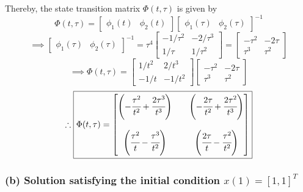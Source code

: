 Thereby, the state transition matrix \( \Phi(t,\tau) \) is given by
\begin{equation*}
    \Phi(t,\tau)
    =
    \begin{bmatrix}
        \phi_1(t) & \phi_2(t)
    \end{bmatrix}
    \begin{bmatrix}
        \phi_1(\tau) & \phi_2(\tau)
    \end{bmatrix}^{-1}
\end{equation*}
\begin{equation*}
    \implies
    \begin{bmatrix}
        \phi_1(\tau) & \phi_2(\tau)
    \end{bmatrix}^{-1}
    =
    \tau^4
    \begin{bmatrix}
        -1/\tau^2 & -2/\tau^3 \\
        1/\tau    & 1/\tau^2
    \end{bmatrix}
    =
    \begin{bmatrix}
        -\tau^2 & -2\tau \\
        \tau^3  & \tau^2
    \end{bmatrix}
\end{equation*}
\begin{equation*}
    \implies
    \Phi(t,\tau)
    =
    \begin{bmatrix}
        1/t^2 & 2/t^3  \\
        -1/t  & -1/t^2
    \end{bmatrix}
    \begin{bmatrix}
        -\tau^2 & -2\tau \\
        \tau^3  & \tau^2
    \end{bmatrix}
\end{equation*}
\begin{equation*}
    \therefore
    \boxed{
        \Phi(t,\tau)
        =
        \begin{bmatrix}
            \left( -\cfrac{\tau^2}{t^2} + \cfrac{2\tau^3}{t^3} \right)
             &  &
            \left( -\cfrac{2\tau}{t^2} + \cfrac{2\tau^2}{t^3}  \right)
            \\ \\
            \left( \cfrac{\tau^2}{t} - \cfrac{\tau^3}{t^2}  \right)
             &  &
            \left( \cfrac{2\tau}{t} - \cfrac{\tau^2}{t^2}  \right)
        \end{bmatrix}
    }
\end{equation*}

\subsubsection*{(b) Solution satisfying the initial condition \( x(1) = {[1, 1]}^T \)}

